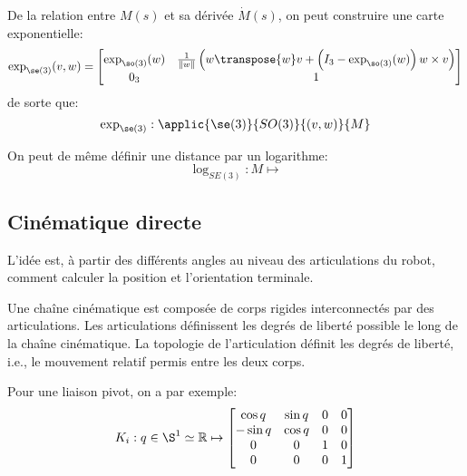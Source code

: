 \documentclass[math]{cours}
\begin{document}
\begin{definition}
	De la relation entre $M(s)$ et sa dérivée $\dot{M}(s)$, on peut construire une carte exponentielle:
	\begin{equation*}
		\exp_{\se(3)}(v, w) = \begin{bmatrix}
			\exp_{\so(3)}(w) & \frac{1}{\norm{w}}\left(w\transpose{w}v + \left(I_{3} - \exp_{\so(3)}(w)\right)w \times v \right) \\
			0_{3}            & 1
		\end{bmatrix}
	\end{equation*}
	de sorte que:
	\begin{equation*}
		\exp_{\se(3)}: \applic{\se(3)}{SO(3)}{(v, w)}{M}
	\end{equation*}
	\label{def:expse3}
\end{definition}

\begin{definition}
	On peut de même définir une distance par un logarithme:
	\begin{equation*}
		\log_{SE(3)}: M \longmapsto
	\end{equation*}
	\label{def:logSE3}
\end{definition}

\subsection{Cinématique directe}
L'idée est, à partir des différents angles au niveau des articulations du robot, comment calculer la position et l'orientation terminale.

\begin{definition}
	Une chaîne cinématique est composée de corps rigides interconnectés par des articulations. Les articulations définissent les degrés de liberté possible le long de la chaîne cinématique.
	La topologie de l'articulation définit les degrés de liberté, i.e., le mouvement relatif permis entre les deux corps.
	\label{def:chainecinematique}
\end{definition}

Pour une liaison pivot, on a par exemple:
\begin{equation*}
			      K_{i}: q\in \S^{1} \simeq \R \mapsto \begin{bmatrix}
				      \cos q  & \sin q & 0 & 0 \\
				      -\sin q & \cos q & 0 & 0 \\
				      0       & 0      & 1 & 0 \\
				      0       & 0      & 0 & 1
			      \end{bmatrix}
		      \end{equation*}
	\label{def:articulations}
\end{document}
